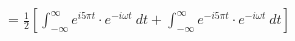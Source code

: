 \documentclass[preview]{standalone}
\begin{document}
\begin{align*}
&=\frac{1}{2}\left[ \int_{-\infty}^{\infty}e^{i5\pi t}\cdot e^{-i\omega t} \ dt+\int_{-\infty}^{\infty} e^{-i5\pi t}\cdot e^{-i\omega t} \ dt \right] \\ \\
\end{align*}
\end{document}
